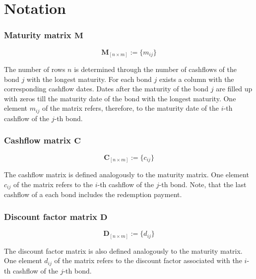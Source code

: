 
\section{Notation}
\label{sec:notation}

\subsubsection*{Maturity matrix $\bm{M}$}

\begin{equation}\label{maturitym}
\bm{M}_{\left[n\times m\right]}:= \{m_{ij}\}
\end{equation}

The number of rows $n$ is determined through the number of cashflows of the bond $j$ with the longest maturity. For each bond $j$ exists a column with the corresponding cashflow dates. Dates after the maturity of the bond $j$ are filled up with zeros till the maturity date of the bond with the longest maturity. One element $m_{ij}$ of the matrix  refers, therefore, to the maturity date of  the $i$-th cashflow of the $j$-th bond.

\subsubsection*{Cashflow matrix $\bm{C}$}

 \begin{equation}\label{cashflowm}
\bm{C}_{\left[n\times m\right]}:= \{c_{ij}\}
\end{equation}

 The cashflow matrix is defined analogously to the maturity matrix.  One element $c_{ij}$  of the matrix refers to the $i$-th cashflow of the $j$-th bond. Note, that the last cashflow of a each bond includes the redemption payment.

\subsubsection*{Discount factor matrix $\bm{D}$}

 \begin{equation}\label{discountm}
\bm{D}_{\left[n\times m\right]}:= \{d_{ij}\}
\end{equation}

 The discount factor matrix is also defined analogously to the maturity matrix. One element $d_{ij}$ of the matrix refers to the discount factor associated with  the $i$-th cashflow of the $j$-th bond.

